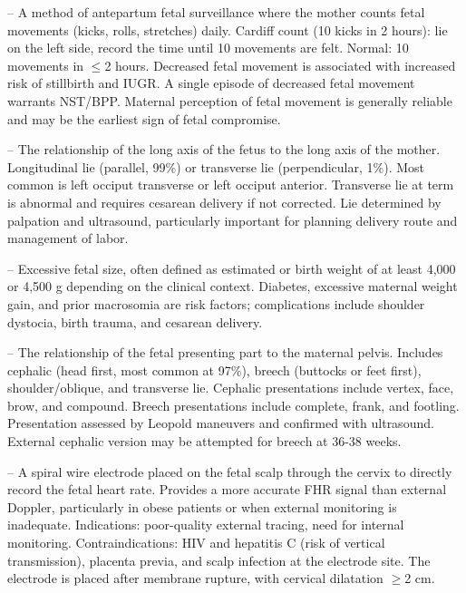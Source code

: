 -- A method of antepartum fetal surveillance where the mother counts fetal movements (kicks, rolls, stretches) daily. Cardiff count (10 kicks in 2 hours): lie on the left side, record the time until 10 movements are felt. Normal: 10 movements in \(\le\)2 hours. Decreased fetal movement is associated with increased risk of stillbirth and IUGR. A single episode of decreased fetal movement warrants NST/BPP. Maternal perception of fetal movement is generally reliable and may be the earliest sign of fetal compromise.

-- The relationship of the long axis of the fetus to the long axis of the mother. Longitudinal lie (parallel, 99\%) or transverse lie (perpendicular, 1\%). Most common is left occiput transverse or left occiput anterior. Transverse lie at term is abnormal and requires cesarean delivery if not corrected. Lie determined by palpation and ultrasound, particularly important for planning delivery route and management of labor.

-- Excessive fetal size, often defined as estimated or birth weight of at least 4,000 or 4,500 g depending on the clinical context. Diabetes, excessive maternal weight gain, and prior macrosomia are risk factors; complications include shoulder dystocia, birth trauma, and cesarean delivery.

-- The relationship of the fetal presenting part to the maternal pelvis. Includes cephalic (head first, most common at 97\%), breech (buttocks or feet first), shoulder/oblique, and transverse lie. Cephalic presentations include vertex, face, brow, and compound. Breech presentations include complete, frank, and footling. Presentation assessed by Leopold maneuvers and confirmed with ultrasound. External cephalic version may be attempted for breech at 36-38 weeks.

-- A spiral wire electrode placed on the fetal scalp through the cervix to directly record the fetal heart rate. Provides a more accurate FHR signal than external Doppler, particularly in obese patients or when external monitoring is inadequate. Indications: poor-quality external tracing, need for internal monitoring. Contraindications: HIV and hepatitis C (risk of vertical transmission), placenta previa, and scalp infection at the electrode site. The electrode is placed after membrane rupture, with cervical dilatation \(\ge\)2 cm.

